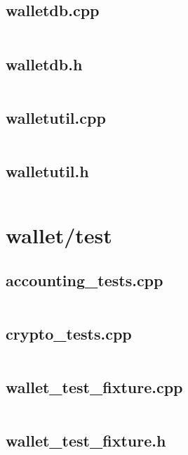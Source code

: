 \documentclass{article}
\begin{document}
\subsection{walletdb.cpp}
\inputminted{cpp}{/home/dufferzafar/dev/@clones/bitcoin/src/wallet/walletdb.cpp}
\newpage

\subsection{walletdb.h}
\inputminted{cpp}{/home/dufferzafar/dev/@clones/bitcoin/src/wallet/walletdb.h}
\newpage

\subsection{walletutil.cpp}
\inputminted{cpp}{/home/dufferzafar/dev/@clones/bitcoin/src/wallet/walletutil.cpp}
\newpage

\subsection{walletutil.h}
\inputminted{cpp}{/home/dufferzafar/dev/@clones/bitcoin/src/wallet/walletutil.h}
\newpage

\section{wallet/test}

\subsection{accounting\_tests.cpp}
\inputminted{cpp}{/home/dufferzafar/dev/@clones/bitcoin/src/wallet/test/accounting_tests.cpp}
\newpage

\subsection{crypto\_tests.cpp}
\inputminted{cpp}{/home/dufferzafar/dev/@clones/bitcoin/src/wallet/test/crypto_tests.cpp}
\newpage

\subsection{wallet\_test\_fixture.cpp}
\inputminted{cpp}{/home/dufferzafar/dev/@clones/bitcoin/src/wallet/test/wallet_test_fixture.cpp}
\newpage

\subsection{wallet\_test\_fixture.h}
\inputminted{cpp}{/home/dufferzafar/dev/@clones/bitcoin/src/wallet/test/wallet_test_fixture.h}
\newpage
\end{document}

